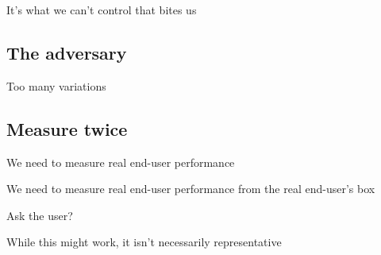 \documentclass{beamer}
\begin{document}
\begin{frame}{}
  \begin{center}
  It's what we can't control that bites us
  \end{center}
\end{frame}

\subsection{The adversary}

\begin{frame}{Too many variations}
  \begin{center}
  \LARGE{
  }
  \end{center}
\end{frame}

\subsection{Measure twice}

\begin{frame}{}
  \begin{center}
  We need to measure real end-user performance
  \end{center}
\end{frame}

\begin{frame}{}
  \begin{center}
  We need to measure real end-user performance from the real end-user's box
  \end{center}
\end{frame}

\begin{frame}{Ask the user?}
  \begin{center}
  \end{center}
\end{frame}

\begin{frame}{}
  \begin{center}
  While this might work, it isn't necessarily representative
  \end{center}
\end{frame}
\end{document}
